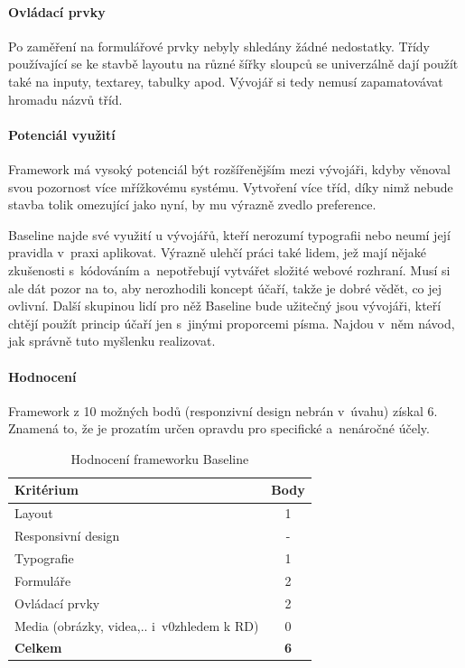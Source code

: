 \documentclass[thesis=B,czech]{FITthesis}[2012/06/26]
\begin{document}
\paragraph{Ovládací prvky}

Po zaměření na formulářové prvky nebyly shledány žádné nedostatky. Třídy používající se ke stavbě layoutu na různé šířky sloupců se univerzálně dají použít také na inputy, textarey, tabulky apod. Vývojář si tedy nemusí zapamatovávat hromadu názvů tříd.

\paragraph{Potenciál využití}

Framework má vysoký potenciál být rozšířenějším mezi vývojáři, kdyby věnoval svou pozornost více mřížkovému systému. Vytvoření více tříd, díky nimž nebude stavba tolik omezující jako nyní, by mu výrazně zvedlo preference.

Baseline najde své využití u vývojářů, kteří nerozumí typografii nebo neumí její pravidla v~praxi aplikovat. Výrazně ulehčí práci také lidem, jež mají nějaké zkušenosti s~kódováním a~nepotřebují vytvářet složité webové rozhraní. Musí si ale dát pozor na to, aby nerozhodili koncept účaří, takže je dobré vědět, co jej ovlivní. Další skupinou lidí pro něž Baseline bude užitečný jsou vývojáři, kteří chtějí použít princip účaří jen s~jinými proporcemi písma. Najdou v~něm návod, jak správně tuto myšlenku realizovat.
\paragraph{Hodnocení}

Framework z 10 možných bodů (responzivní design nebrán v~úvahu) získal 6. Znamená to, že je prozatím určen opravdu pro specifické a~nenáročné účely.

\begin{table}\centering
 	\caption[Hodnocení Baseline]{Hodnocení frameworku Baseline}\label{tab:baseline}
 	\begin{tabular}{|l|c|}\hline
 	\textbf{Kritérium} & \textbf{Body}\tabularnewline
 	\hline\hline
		Layout & 1\tabularnewline
		\hline 
		 Responsivní design & -\tabularnewline
		\hline 
		Typografie & 1\tabularnewline
		\hline 
		Formuláře & 2\tabularnewline
		\hline 
		Ovládací prvky & 2\tabularnewline
		\hline 
		Media  (obrázky, videa,.. i~v0zhledem k RD) & 0\tabularnewline
		\hline 
		\textbf{Celkem} & \textbf{6}\tabularnewline
		\hline 
 	\end{tabular}
\end{table} 
\end{document}
